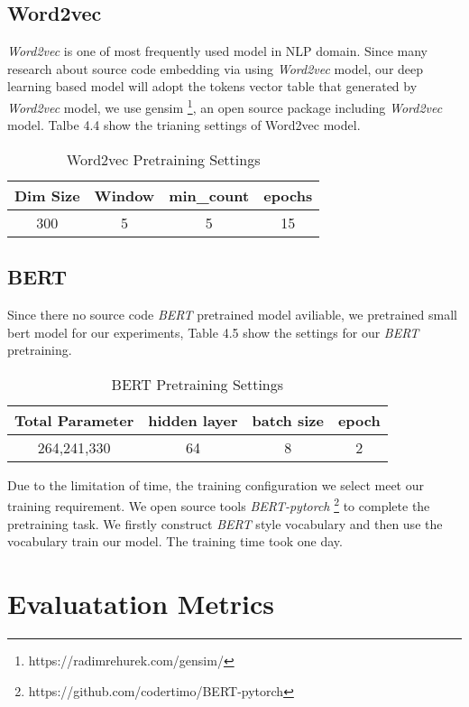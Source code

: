 \subsection{Word2vec}
\textit{Word2vec} is one of most frequently used model in NLP domain. Since many research about source code embedding via using \textit{Word2vec} model, our deep learning based model will adopt the tokens vector table that generated by \textit{Word2vec} model, we use gensim \footnote{https://radimrehurek.com/gensim/}, an open source package including \textit{Word2vec} model. Talbe 4.4 show the trianing settings of Word2vec model.

\begin{table}[h]
    \centering
    \begin{tabular}{c|c|c|c}
        \toprule[2pt]
        Dim Size & Window & min\_count & epochs \\
        \toprule[1pt]
        300 & 5 & 5 & 15 \\
        \toprule[2pt]
    \end{tabular}
    \caption{Word2vec Pretraining Settings}
    \label{tab:my_label}
\end{table}


\subsection{BERT}
Since there no source code \textit{BERT} pretrained model aviliable, we pretrained small bert model for our experiments, Table 4.5 show the settings for our \textit{BERT} pretraining. 
\begin{table}[h]
    \centering
    \begin{tabular}{c|c|c|c}
    \toprule[2pt]
        Total Parameter & hidden layer & batch size & epoch \\
    \toprule[1pt]
         264,241,330 & 64 & 8 & 2 \\
    \toprule[2pt]
    \end{tabular}
    \caption{BERT Pretraining Settings}
    \label{tab:my_label}
\end{table}
Due to the limitation of time, the training configuration we select meet our training requirement. We open source tools \textit{BERT-pytorch} \footnote{https://github.com/codertimo/BERT-pytorch} to complete the pretraining task. We firstly construct \textit{BERT} style vocabulary and then use the vocabulary train our model. The training time took one day. 

\section{Evaluatation Metrics}

